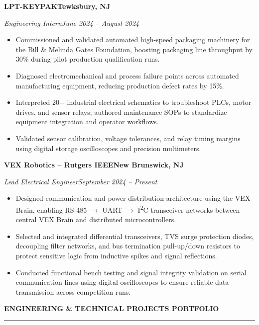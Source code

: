 \documentclass[10pt]{article}
\newcommand{\Section}[1]{%
  \vspace{4.5pt}%
  \textbf{\MakeUppercase{#1}}\par\vspace{-3.5pt}%
  \rule{\linewidth}{0.55pt}\par\vspace{2.5pt}%
}
\newcommand{\Company}[2]{\noindent\textbf{#1}\hfill\textbf{#2}\par}
\newcommand{\RoleDates}[2]{\noindent\textit{#1}\hfill\textit{#2}\par}
\begin{document}
\vspace{5.0pt}
\Company{LPT-KEYPAK}{Tewksbury, NJ}
\RoleDates{Engineering Intern}{June 2024 -- August 2024}
\begin{itemize}
  \item Commissioned and validated automated high-speed packaging machinery for the Bill \& Melinda Gates Foundation, boosting packaging line throughput by 30\% during pilot production qualification runs.
  \item Diagnosed electromechanical and process failure points across automated manufacturing equipment, reducing production defect rates by 15\%.
  \item Interpreted 20+ industrial electrical schematics to troubleshoot PLCs, motor drives, and sensor relays; authored maintenance SOPs to standardize equipment integration and operator workflows.
  \item Validated sensor calibration, voltage tolerances, and relay timing margins using digital storage oscilloscopes and precision multimeters.
\end{itemize}

\vspace{5.0pt}
\Company{VEX Robotics -- Rutgers IEEE}{New Brunswick, NJ}
\RoleDates{Lead Electrical Engineer}{September 2024 -- Present}
\begin{itemize}
  \item Designed communication and power distribution architecture using the VEX Brain, enabling RS-485 $\rightarrow$ UART $\rightarrow$ I\textsuperscript{2}C transceiver networks between central VEX Brain and distributed microcontrollers.
  \item Selected and integrated differential transceivers, TVS surge protection diodes, decoupling filter networks, and bus termination pull-up/down resistors to protect sensitive logic from inductive spikes and signal reflections.
  \item Conducted functional bench testing and signal integrity validation on serial communication lines using digital oscilloscopes to ensure reliable data transmission across competition runs.
\end{itemize}

\newpage

\Section{Engineering \& Technical Projects Portfolio}
\end{document}
